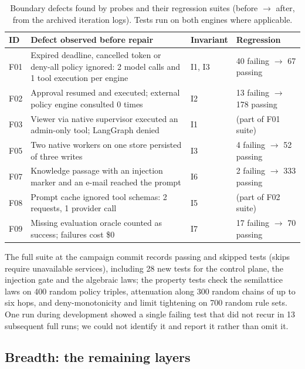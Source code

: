 \begin{table}[t]
\centering\small
\caption{Boundary defects found by probes and their regression suites (before $\to$ after, from the archived iteration logs). Tests run on both engines where applicable.}
\label{tab:conformance}
\begin{tabularx}{\textwidth}{P{0.6cm}YP{2.3cm}P{2.5cm}}
\toprule
ID & Defect observed before repair & Invariant & Regression \\
\midrule
F01 & Expired deadline, cancelled token or deny-all policy ignored: 2 model calls and 1 tool execution per engine & I1, I3 & 40 failing $\to$ 67 passing \\
F02 & Approval resumed and executed; external policy engine consulted 0 times & I2 & 13 failing $\to$ 178 passing \\
F03 & Viewer via native supervisor executed an admin-only tool; LangGraph denied & I1 & (part of F01 suite) \\
F05 & Two native workers on one store persisted  of three writes & I3 & 4 failing $\to$ 52 passing \\
F07 & Knowledge passage with an injection marker and an e-mail reached the prompt & I6 & 2 failing $\to$ 333 passing \\
F08 & Prompt cache ignored tool schemas: 2 requests, 1 provider call & I5 & (part of F02 suite) \\
F09 & Missing evaluation oracle counted as success; failures cost \$0 & I7 & 17 failing $\to$ 70 passing \\
\bottomrule
\end{tabularx}
\end{table}
The full suite at the campaign commit records \TestsPassed{} passing and \TestsSkipped{} skipped tests (skips require unavailable services), including 28 new tests for the control plane, the injection gate and the algebraic laws; the property tests check the semilattice laws on 400 random policy triples, attenuation along 300 random chains of up to six hops, and deny-monotonicity and limit tightening on 700 random rule sets. One run during development showed a single failing test that did not recur in 13 subsequent full runs; we could not identify it and report it rather than omit it.

\subsection{Breadth: the remaining layers}
\label{sec:breadth}
